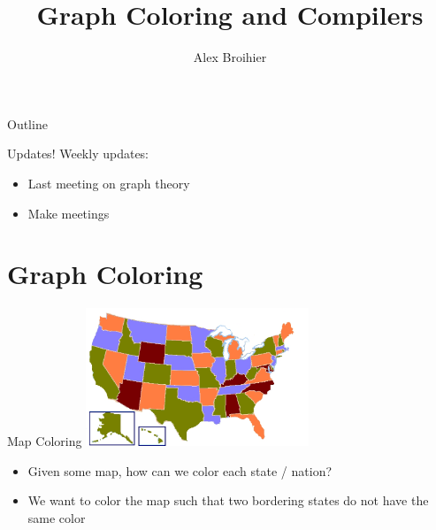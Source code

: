 \documentclass[aspectratio=169]{beamer}
\title{Graph Coloring and Compilers}
\author{Alex Broihier}
\date{}
\begin{document}

\begin{frame}
\titlepage
\end{frame}

\begin{frame}{Outline}
  \tableofcontents
\end{frame}

\begin{frame}{Updates!}
  Weekly updates:
  \begin{itemize}
    \item Last meeting on graph theory
    \item Make meetings
  \end{itemize}
\end{frame}

\section{Graph Coloring}
\frame{\sectionpage}

\begin{frame}{Map Coloring}
    \centering
    \includegraphics[width=0.5\textwidth]{map.png}
    \begin{itemize}
        \item Given some map, how can we color each state / nation?
        \item We want to color the map such that two bordering states do not have the same color
    \end{itemize}
    \nocite{wiki}
\end{frame}
\end{document}
